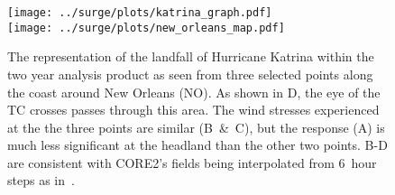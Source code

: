 
\begin{figure}[htb!]
\centering
\texttt{[image: ../surge/plots/katrina\_graph.pdf]}\\
\vspace{-9pt}
\texttt{[image: ../surge/plots/new\_orleans\_map.pdf]}
\caption{The representation of the landfall of Hurricane Katrina within the
two year analysis product as seen from three selected points along
the coast around New Orleans (NO). As shown in D, the eye of the TC
crosses passes through this area. The wind stresses experienced at the
the three points are similar (B~\&~C), but the response (A) is much
less significant at the headland than the other two points.
B-D are consistent with CORE2's fields being interpolated from 6~hour
steps as in~\cite{core2expert}.
}
\label{fig:katrina}
\end{figure}

